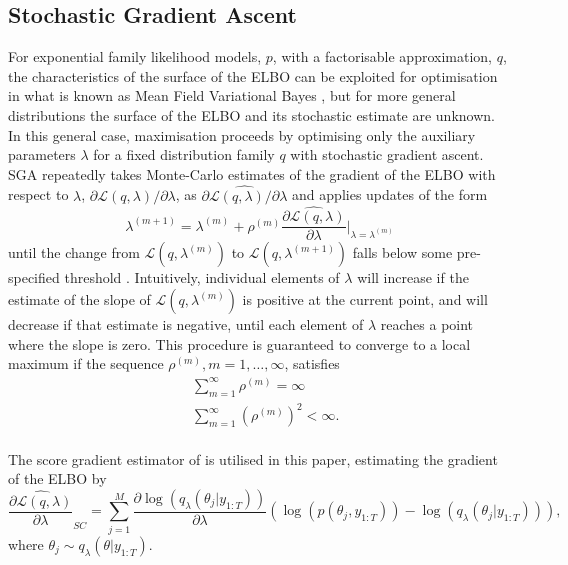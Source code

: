 \documentclass[12pt,a4paper]{article}\usepackage[]{graphicx}\usepackage[]{color}
\begin{document}
\subsection{Stochastic Gradient Ascent}
\label{subsec:SGA}
For exponential family likelihood models, $p$, with a factorisable approximation, $q$, the characteristics of the surface of the ELBO can be exploited for optimisation in what is known as Mean Field Variational Bayes \citep{Jordan1999, Ghahramani2000, Wainwright2008}, but for more general distributions the surface of the ELBO and its stochastic estimate are unknown. In this general case, maximisation proceeds by optimising only the auxiliary parameters $\lambda$ for a fixed distribution family $q$ with stochastic gradient ascent.
\\

SGA repeatedly takes Monte-Carlo estimates of the gradient of the ELBO with respect to $\lambda$, $\partial\mathcal{L}(q, \lambda) / \partial \lambda$, as $\widehat{\partial\mathcal{L}(q, \lambda) / \partial \lambda}$ and applies updates of the form
\begin{equation}
\label{gradientAscent}
\lambda^{(m+1)} = \lambda^{(m)} + \rho^{(m)} \widehat{\frac{\partial\mathcal{L}(q, \lambda)}{\partial \lambda}} \bigg\rvert_{\lambda = \lambda^{(m)}}
\end{equation}
until the change from $\mathcal{L}(q, \lambda^{(m)})$ to $\mathcal{L}(q, \lambda^{(m+1)})$ falls below some pre-specified threshold \citep{Hoffman2013}. Intuitively, individual elements of $\lambda$ will increase if the estimate of the slope of $\mathcal{L}(q, \lambda^{(m)})$ is positive at the current point, and will decrease if that estimate is negative, until each element of $\lambda$ reaches a point where the slope is zero. This procedure is guaranteed to converge to a local maximum \citep{Robbins1951} if the sequence $\rho^{(m)}, m = 1, \dots, \infty$, satisfies
\begin{align}
&\sum_{m=1}^{\infty} \rho^{(m)} =  \infty \\
&\sum_{m=1}^{\infty} (\rho^{(m)})^2 <  \infty.
\end{align}
\\

The score gradient estimator of \citet{Ranganath2014} is utilised in this paper, estimating the gradient of the ELBO by
\begin{equation}
\label{scoreDeriv}
\widehat{\frac{\partial\mathcal{L}(q, \lambda)}{\partial \lambda}}_{SC} = \sum_{j = 1}^M \frac{\partial \log(q_{\lambda}(\theta_{j} | y_{1:T}))}{\partial \lambda} \left(\log(p(\theta_{j}, y_{1:T})) - \log(q_{\lambda}(\theta_{j} | y_{1:T})) \right),
\end{equation}
where $\theta_{j} \sim q_{\lambda}(\theta | y_{1:T})$.
\end{document}
